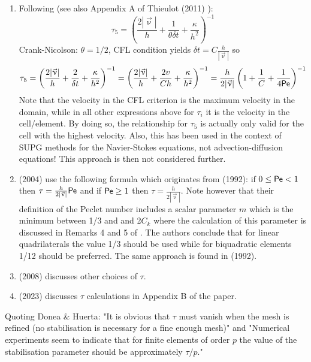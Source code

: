\begin{enumerate}
\item Following \textcite{teos00} (see also Appendix A of Thieulot (2011) \cite{thie11}):
\[
\tau_5 = \left( \frac{2 |\vec{\upnu}|}{h} + \frac{1}{\theta \delta t} + \frac{\kappa}{h^2} \right)^{-1}  
\]
Crank-Nicolson: $\theta=1/2$, CFL condition yields $\delta t = C \frac{h}{|\vec\upnu|}$ so 
\[
\tau_5 = \left( \frac{2 |\vec{\upnu}|}{h} + \frac{2}{\delta t}+  \frac{\kappa}{h^2}  \right)^{-1}  
= \left( \frac{2 |\vec{\upnu}|}{h} + \frac{2 v}{C h} +  \frac{\kappa}{h^2}  \right)^{-1}  
= \frac{h}{2 |\vec{\upnu}|}  \left( 1 + \frac{1}{C} + \frac{1}{4 {\mathsf{Pe}}} \right)^{-1} \nonumber 
\]
Note that the velocity in the CFL criterion is the maximum velocity in the domain, while 
in all other expressions above for $\tau_i$ it is the velocity in the cell/element. 
By doing so, the relationship  for $\tau_5$ is actually only valid for the cell with the 
highest velocity. 
Also, this has been used in the context of SUPG methods for the Navier-Stokes equations, 
not advection-diffusion equations! This approach is then not considered further.

\item \textcite{frhm04} (2004) use the following formula which originates from 
\textcite{frfh92} (1992): if $0\le {\mathsf{Pe}} < 1$ then
$\tau = \frac{h}{2 |\vec\upnu|} {\mathsf{Pe}}$ and if ${\mathsf{Pe}} \ge 1$ then $\tau = \frac{h}{2 |\vec\upnu|}$.
Note however that their definition of the Peclet number includes a scalar parameter $m$ which is 
the minimum between 1/3 and and 2$C_k$ where the calculation of this parameter is discussed in 
Remarks 4 and 5 of \cite{frfh92}. The authors conclude that for linear quadrilaterals the value
1/3 should be used while for biquadratic elements 1/12 should be preferred.
The same approach is found in \textcite{brbf92} (1992). 

\item \textcite{knob08} (2008) discusses other choices of $\tau$.

\item \textcite{alex23} (2023) discusses $\tau$ calculations in Appendix B of the paper.


\end{enumerate}

Quoting Donea \& Huerta: "It is obvious that $\tau$ must vanish when the mesh is refined (no stabilisation
is necessary for a fine enough mesh)" and "Numerical experiments seem to indicate that for 
finite elements of order $p$ the value of the stabilisation parameter should be approximately 
$\tau/p$."

